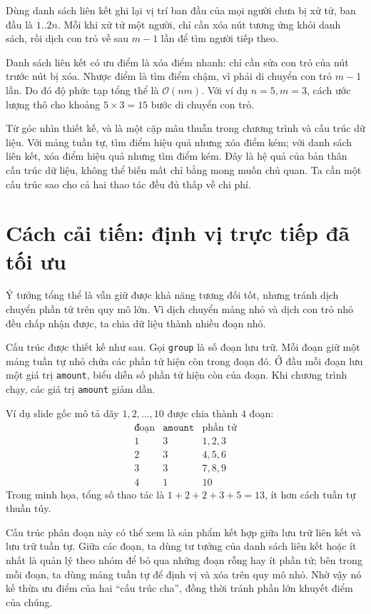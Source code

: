 \documentclass[11pt]{article}
\newcommand{\Oh}{\mathcal{O}}
\begin{document}
Dùng danh sách liên kết ghi lại vị trí ban đầu của mọi người chưa bị xử tử,
ban đầu là \(1..2n\). Mỗi khi xử tử một người, chỉ cần xóa nút tương ứng khỏi
danh sách, rồi dịch con trỏ về sau \(m-1\) lần để tìm người tiếp theo.

Danh sách liên kết có ưu điểm là xóa điểm nhanh: chỉ cần sửa con trỏ của nút
trước nút bị xóa. Nhược điểm là tìm điểm chậm, vì phải di chuyển con trỏ
\(m-1\) lần. Do đó độ phức tạp tổng thể là \(\Oh(nm)\). Với ví dụ
\(n=5,m=3\), cách ước lượng thô cho khoảng \(5\times3=15\) bước di chuyển
con trỏ.

Từ góc nhìn thiết kế,  và  là một cặp mâu thuẫn
trong chương trình và cấu trúc dữ liệu. Với mảng tuần tự, tìm điểm hiệu quả
nhưng xóa điểm kém; với danh sách liên kết, xóa điểm hiệu quả nhưng tìm điểm
kém. Đây là hệ quả của bản thân cấu trúc dữ liệu, không thể biến mất chỉ bằng
mong muốn chủ quan. Ta cần một cấu trúc sao cho cả hai thao tác đều đủ thấp
về chi phí.

\section{Cách cải tiến: định vị trực tiếp đã tối ưu}

Ý tưởng tổng thể là vẫn giữ được khả năng  tương đối
tốt, nhưng tránh dịch chuyển phần tử trên quy mô lớn. Vì dịch chuyển mảng nhỏ
và dịch con trỏ nhỏ đều chấp nhận được, ta chia dữ liệu thành nhiều đoạn nhỏ.

Cấu trúc được thiết kế như sau. Gọi \texttt{group} là số đoạn lưu trữ. Mỗi
đoạn giữ một mảng tuần tự nhỏ chứa các phần tử hiện còn trong đoạn đó. Ở đầu
mỗi đoạn lưu một giá trị \texttt{amount}, biểu diễn số phần tử hiện còn của
đoạn. Khi chương trình chạy, các giá trị \texttt{amount} giảm dần.

Ví dụ slide gốc mô tả dãy \(1,2,\ldots,10\) được chia thành \(4\) đoạn:
\[
\begin{array}{c|c|l}
\text{đoạn} & \texttt{amount} & \text{phần tử}\\ \hline
1 & 3 & 1,2,3\\
2 & 3 & 4,5,6\\
3 & 3 & 7,8,9\\
4 & 1 & 10
\end{array}
\]
Trong minh họa, tổng số thao tác là \(1+2+2+3+5=13\), ít hơn cách tuần tự
thuần túy.

Cấu trúc phân đoạn này có thể xem là sản phẩm kết hợp giữa lưu trữ liên kết và
lưu trữ tuần tự. Giữa các đoạn, ta dùng tư tưởng của danh sách liên kết hoặc
ít nhất là quản lý theo nhóm để bỏ qua những đoạn rỗng hay ít phần tử; bên
trong mỗi đoạn, ta dùng mảng tuần tự để định vị và xóa trên quy mô nhỏ. Nhờ
vậy nó kế thừa ưu điểm của hai ``cấu trúc cha'', đồng thời tránh phần lớn
khuyết điểm của chúng.
\end{document}
